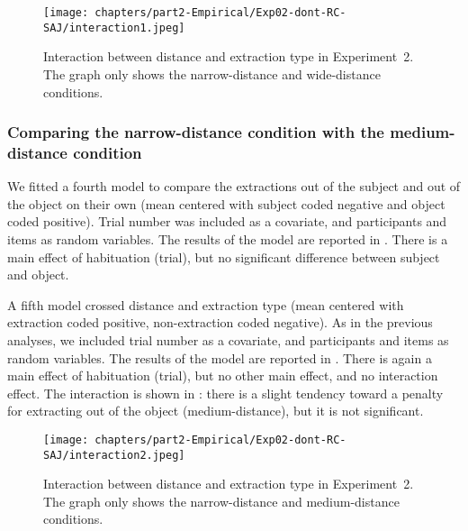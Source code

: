

\begin{figure}
    \centering
    \texttt{[image: chapters/part2-Empirical/Exp02-dont-RC-SAJ/interaction1.jpeg]}
    \caption{Interaction between distance and extraction type in Experiment~2. The graph only shows the narrow-distance and wide-distance conditions.}
    \label{fig:exp02-interaction1}
\end{figure}

\subsubsection{Comparing the narrow-distance condition with the medium-distance condition}
\largerpage[2.25]

We fitted a fourth model to compare the extractions out of the subject and out of the object on their own (mean centered with subject coded negative and object coded positive). Trial number was included as a covariate, and participants and items as random variables. The results of the model are reported in . 
There is a main effect of habituation (trial), but no significant difference between subject and object.



A fifth model crossed distance and extraction type (mean centered with extraction coded positive, non-extraction coded negative). As in the previous analyses, we included trial number as a covariate, and participants and items as random variables. The results of the model are reported in . 
There is again a main effect of habituation (trial), but no other main effect, and no interaction effect. The interaction is shown in : there is a slight tendency toward a penalty for extracting out of the object (medium-distance), but it is not significant.



\begin{figure}
    \centering
    \texttt{[image: chapters/part2-Empirical/Exp02-dont-RC-SAJ/interaction2.jpeg]}
    \caption{Interaction between distance and extraction type in Experiment~2. The graph only shows the narrow-distance and medium-distance conditions.}
    \label{fig:exp02-interaction2}
\end{figure}

